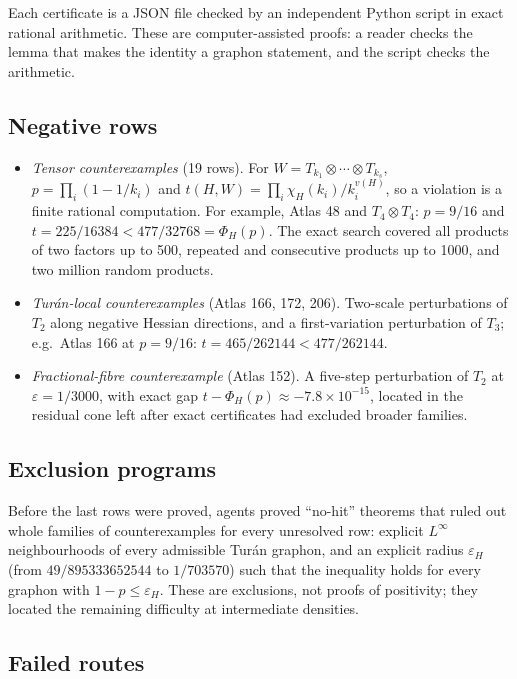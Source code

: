 \documentclass[11pt,a4paper]{article}
\begin{document}
Each certificate is a JSON file checked by an independent Python script in exact rational arithmetic. These are
computer-assisted proofs: a reader checks the lemma that makes the identity a graphon statement, and the script
checks the arithmetic.

\subsection{Negative rows}

\begin{itemize}
\item \emph{Tensor counterexamples} (19 rows). For $W=T_{k_1}\otimes\cdots\otimes T_{k_s}$, $p=\prod_i(1-1/k_i)$
  and $t(H,W)=\prod_i\chi_H(k_i)/k_i^{v(H)}$, so a violation is a finite rational computation. For example, Atlas
  48 and $T_4\otimes T_4$: $p=9/16$ and $t=225/16384<477/32768=\Phi_H(p)$. The exact search covered all products
  of two factors up to 500, repeated and consecutive products up to 1000, and two million random products.
\item \emph{Tur\'an-local counterexamples} (Atlas 166, 172, 206). Two-scale perturbations of $T_2$ along negative
  Hessian directions, and a first-variation perturbation of $T_3$; e.g.\ Atlas 166 at $p=9/16$: $t=465/262144<
  477/262144$.
\item \emph{Fractional-fibre counterexample} (Atlas 152). A five-step perturbation of $T_2$ at $\varepsilon=1/3000$,
  with exact gap $t-\Phi_H(p)\approx-7.8\times10^{-15}$, located in the residual cone left after exact
  certificates had excluded broader families.
\end{itemize}

\subsection{Exclusion programs}

Before the last rows were proved, agents proved ``no-hit'' theorems that ruled out whole families of
counterexamples for every unresolved row: explicit $L^\infty$ neighbourhoods of every admissible Tur\'an graphon,
and an explicit radius $\varepsilon_H$ (from $49/895333652544$ to $1/703570$) such that the inequality holds for
every graphon with $1-p\le\varepsilon_H$. These are exclusions, not proofs of positivity; they located the
remaining difficulty at intermediate densities.

\subsection{Failed routes}
\end{document}
